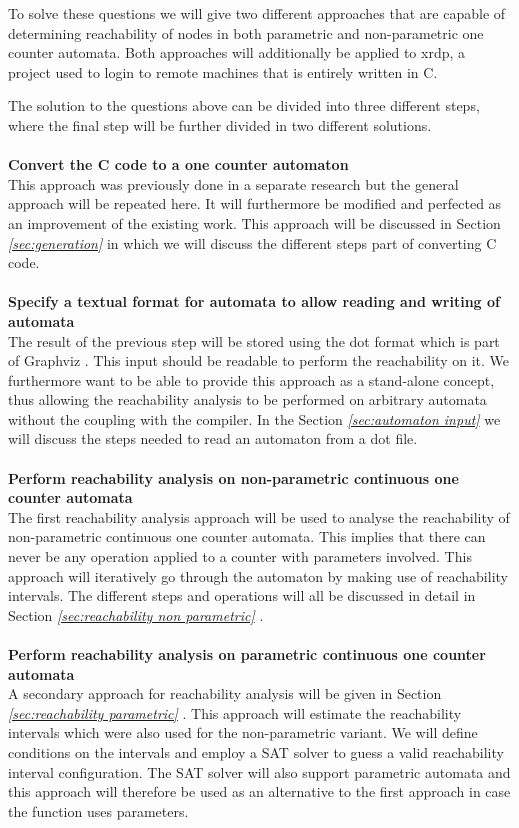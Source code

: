 \documentclass[12pt]{article}
\begin{document}
To solve these questions we will give two different approaches that are capable of determining reachability of nodes in both parametric and non-parametric one counter automata. Both approaches will additionally be applied to xrdp, a project used to login to remote machines that is entirely written in C. 

The solution to the questions above can be divided into three different steps, where the final step will be further divided in two different solutions.\\
\\
\noindent
\textbf{Convert the C code to a one counter automaton} \\
This approach was previously done in a separate research but the general approach will be repeated here. It will furthermore be modified and perfected as an improvement of the existing work. This approach will be discussed in Section \textit{\ref{sec:generation} } in which we will discuss the different steps part of converting C code.\\
\\
\noindent
\textbf{Specify a textual format for automata to allow reading and writing of automata}\\
The result of the previous step will be stored using the dot format which is part of Graphviz \cite{10.1007/3-540-45848-4_57}. This input should be readable to perform the reachability on it. We furthermore want to be able to provide this approach as a stand-alone concept, thus allowing the reachability analysis to be performed on arbitrary automata without the coupling with the compiler. In the Section \textit{\ref{sec:automaton input} } we will discuss the steps needed to read an automaton from a dot file.\\
\\
\noindent
\textbf{Perform reachability analysis on non-parametric continuous one counter automata} \\
The first reachability analysis approach will be used to analyse the reachability of non-parametric continuous one counter automata. This implies that there can never be any operation applied to a counter with parameters involved. This approach will iteratively go through the automaton by making use of reachability intervals. The different steps and operations will all be discussed in detail in Section \textit{\ref{sec:reachability non parametric} }.\\
\\
\noindent
\textbf{Perform reachability analysis on parametric continuous one counter automata} \\
A secondary approach for reachability analysis will be given in Section \textit{\ref{sec:reachability parametric} }. This approach will estimate the reachability intervals which were also used for the non-parametric variant. We will define conditions on the intervals and employ a SAT solver to guess a valid reachability interval configuration. The SAT solver will also support parametric automata and this approach will therefore be used as an alternative to the first approach in case the function uses parameters.
\end{document}
